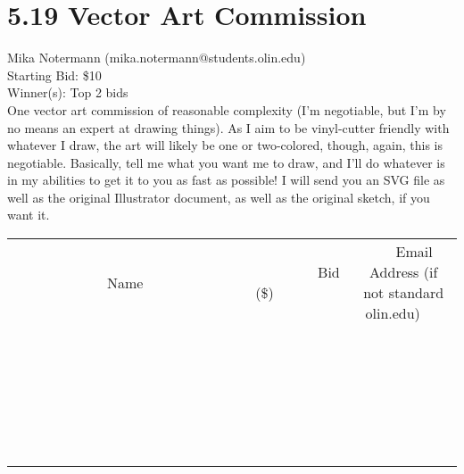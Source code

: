 \documentclass[11pt]{article}
\begin{document}
\section*{5.19 Vector Art Commission}
Mika Notermann (mika.notermann@students.olin.edu) \\
Starting Bid: \$10 \\
Winner(s): 
Top 2 bids \\
One vector art commission of reasonable complexity (I'm negotiable, but I'm by no means an expert at drawing things). As I aim to be vinyl-cutter friendly with whatever I draw, the art will likely be one or two-colored, though, again, this is negotiable. Basically, tell me what you want me to draw, and I'll do whatever is in my abilities to get it to you as fast as possible! I will send you an SVG file as well as the original Illustrator document, as well as the original sketch, if you want it. \\[6ex]
\begin{tabular}{c c c}
~~~~~~~~~~~~~Name~~~~~~~~~~~~~ & ~~~~~~~~~Bid (\$)~~~~~~~~~ & ~~~Email Address (if not standard olin.edu)~~~ \\
 & & \\
\hline
 & & \\
\hline
 & & \\
\hline
 & & \\
\hline
 & & \\
\hline
 & & \\
\hline
 & & \\
\hline
 & & \\
\hline
 & & \\
\hline
 & & \\
\hline
 & & \\
\hline
 & & \\
\hline
 & & \\
\hline
 & & \\
\hline
 & & \\
\hline
 & & \\
\hline
 & & \\
\hline
 & & \\
\hline
 & & \\
\hline
 & & \\
\hline
 & & \\
\hline
 & & \\
\hline
 & & \\
\hline
 & & \\
\hline
 & & \\
\hline
 & & \\
\hline
\end{tabular}
\clearpage
\end{document}
